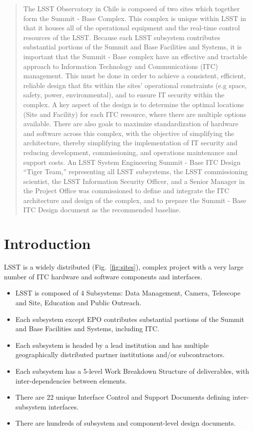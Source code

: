 \documentclass[11pt,twoside]{article}
\begin{document}
\begin{abstract}
  The LSST Observatory in Chile is composed of two sites which together form the Summit - Base Complex. This complex is unique within LSST in that it houses all of the operational equipment and the real-time control resources of the LSST.
  Because each LSST subsystem contributes substantial portions of the Summit and Base Facilities and Systems, it is important that the Summit - Base complex have an effective and tractable approach to Information Technology and Communications (ITC) management. This must be done in order to achieve a consistent, efficient, reliable design that fits within the sites' operational constraints (e.g space, safety, power, environmental), and to ensure IT security within the complex. A key aspect of the design is to determine the optimal locations (Site and Facility) for each ITC resource, where there are multiple options available.
  There are also goals to maximize standardization of hardware and software across this complex, with the objective of simplifying the architecture, thereby simplifying the implementation of IT security and reducing development, commissioning, and operations maintenance and support costs.
  An LSST System Engineering Summit - Base ITC Design ``Tiger Team,'' representing all LSST subsystems, the LSST commissioning scientist, the LSST Information Security Officer, and a Senior Manager in the Project Office was commissioned to define and integrate the ITC architecture and design of the complex, and to prepare the Summit - Base ITC Design document as the recommended baseline.
\end{abstract}

\section{Introduction}

LSST is a widely distributed (Fig.~\ref{fig:sites}), complex project with a very large number of ITC hardware and software components and interfaces.


\begin{itemize}

\item LSST is composed of 4 Subsystems: Data Management, Camera, Telescope and Site, Education and Public Outreach.
\item Each subsystem except EPO contributes substantial portions of the Summit and Base Facilities and Systems, including ITC.
\item Each subsystem is headed by a lead institution and has multiple geographically distributed partner institutions and/or subcontractors.
\item Each subsystem has a 5-level Work Breakdown Structure of deliverables, with inter-dependencies between elements.
\item There are 22 unique Interface Control and Support Documents defining inter-subsystem interfaces.
\item There are hundreds of subsystem and component-level design documents.
\end{itemize}
\end{document}
